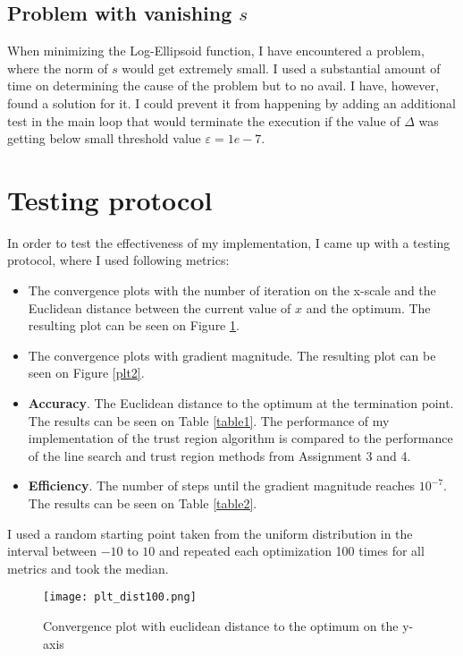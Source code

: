 \documentclass[a4paper]{article}
\begin{document}
\subsection{Problem with vanishing $s$}
When minimizing the Log-Ellipsoid function, I have encountered a problem, where
the norm of $s$ would get extremely small. I used a substantial amount of time
on determining the cause of the problem but to no avail. I have, however, found
a solution for it. I could prevent it from happening by adding an additional
test in the main loop that would terminate the execution if the value of
$\Delta$ was getting below small threshold value $\varepsilon = 1e-7$.


\section{Testing protocol}
In order to test the effectiveness of my implementation, I came up with a
testing protocol, where I used following metrics:
\begin{itemize}
\item The convergence plots with the number of iteration on the x-scale and the
  Euclidean distance between the current value of $x$ and the
  optimum. The resulting plot can be seen on Figure \ref{plt1}.
\item The convergence plots with gradient magnitude.
  The resulting plot can be seen on Figure \ref{plt2}. 
\item \textbf{Accuracy}. The Euclidean distance to the optimum at the
  termination point. The results can be seen on Table \ref{table1}.
  The performance of my implementation of the trust
  region algorithm is compared to the performance of the line search and trust
  region methods from Assignment 3 and 4.
\item \textbf{Efficiency}. The number of steps until the gradient
  magnitude reaches $10^{-7}$. The results can be seen on Table \ref{table2}.
\end{itemize}
I used a random starting point taken from the uniform distribution in the
interval between $-10$ to $10$ and repeated each optimization 100 times for all
metrics and took the median.


\begin{figure}[]
    \centering
    \texttt{[image: plt\_dist100.png]}
    \caption{Convergence plot with euclidean distance to the optimum on the y-axis}
  \label{plt1}
\end{figure}
\end{document}
